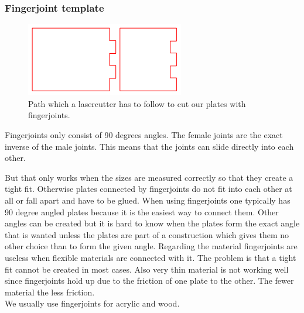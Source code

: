 \documentclass[../ClassicThesis.tex]{subfiles}
\begin{document}
\subsubsection{Fingerjoint template}
\begin{minipage}{0.4\textwidth}
\begin{figure}[!ht]
\centering
\includegraphics[width=1\columnwidth]{Images/fingerjoints.png}
\caption{Path which a lasercutter has to follow to cut our plates with fingerjoints.}
\end{figure}


\end{minipage}
\begin{minipage}{0.6\textwidth}
Fingerjoints only consist of 90 degrees angles. The female joints are the exact inverse of the male joints. This means that the joints can slide directly into each other. 
\end{minipage}
But that only works when the sizes are measured correctly so that they create a tight fit. Otherwise plates connected by fingerjoints do not fit into each other at all or fall apart and have to be glued. 
When using fingerjoints one typically has 90 degree angled plates because it is the easiest way to connect them. Other angles can be created but it is hard to know when the plates form the exact angle that is wanted unless the plates are part of a construction which gives them no other choice than to form the given angle.
Regarding the material fingerjoints are useless when flexible materials are connected with it. The problem is that a tight fit cannot be created in most cases. Also very thin material is not working well since fingerjoints hold up due to the friction of one plate to the other. The fewer material the less friction.\\
We usually use fingerjoints for acrylic and wood.
\end{document}
